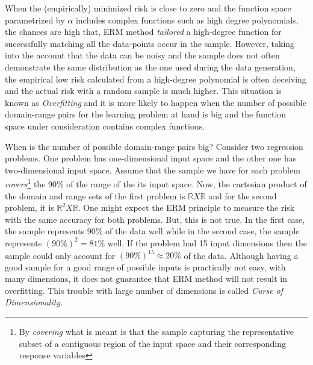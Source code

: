 {When the (empirically) minimized risk is close to zero and the function space parametrized by $\alpha$ includes complex functions such as high degree polynomials, the chances are high that, ERM method \textit{tailored} a high-degree function for successfully matching all the data-points occur in the sample. However, taking into the account that the data can be noisy and the sample does not often demonstrate the same distribution as the one used during the data generation, the empirical low risk calculated from a high-degree polynomial is often deceiving and the actual risk with a random sample is much higher. This situation is known as \textit{Overfitting} and it is more likely to happen when the number of possible domain-range pairs for the learning problem at hand is big and the function space under consideration contains complex functions. 

When is the number of possible domain-range pairs big? Consider two regression problems. One problem has  one-dimensional input space and the other one has two-dimensional input space. Assume that the sample we have for each problem \textit{covers}\footnote{By \textit{covering} what is meant is that the sample capturing the representative subset of a contiguous region of the input space and their corresponding response variables} the 90\% of the range of the its input space. Now, the cartesian product of the domain and range sets of the first problem is $\mathbb{R} X \mathbb{R}$ and for the second problem, it is $\mathbb{R}^2 X \mathbb{R}$. One might expect the ERM principle to measure the risk with the same accuracy for both problems. But, this is not true. In the first case, the sample represents 90\% of the data well while in the second case, the sample represents $(90\%)^2 = 81\% $ well. If the problem had 15 input dimensions then the sample could only account for $(90\%)^{15}
 \approx 20\% $ of the data. Although having a good sample for a good range of possible inputs is practically not easy, with many dimensions, it does not guarantee that ERM method will not result in overfitting. This trouble with large number of dimensions is called \textit{Curse of Dimensionality}. 
 
}
